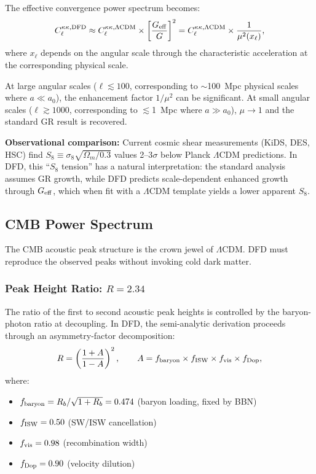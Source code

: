 \documentclass[aps,prd,twocolumn,superscriptaddress,nofootinbib]{revtex4-2}
\begin{document}
The effective convergence power spectrum becomes:
\begin{equation}
C_\ell^{\kappa\kappa,\rm DFD} \approx
C_\ell^{\kappa\kappa,\rm \Lambda CDM}\times
\left[\frac{G_{\rm eff}}{G}\right]^2
= C_\ell^{\kappa\kappa,\rm \Lambda CDM}\times\frac{1}{\mu^2(x_\ell)},
\end{equation}
where $x_\ell$ depends on the angular scale through the
characteristic acceleration at the corresponding physical scale.

At large angular scales ($\ell \lesssim 100$, corresponding to
$\sim$100~Mpc physical scales where $a \ll a_0$), the enhancement
factor $1/\mu^2$ can be significant. At small angular scales
($\ell \gtrsim 1000$, corresponding to $\lesssim$1~Mpc where
$a \gg a_0$), $\mu \to 1$ and the standard GR result is recovered.

\textbf{Observational comparison:} Current cosmic shear measurements
(KiDS, DES, HSC) find $S_8 \equiv \sigma_8\sqrt{\Omega_m/0.3}$
values 2--3$\sigma$ below Planck $\Lambda$CDM predictions. In DFD,
this ``$S_8$ tension'' has a natural interpretation: the standard
analysis assumes GR growth, while DFD predicts scale-dependent
enhanced growth through $G_{\rm eff}$, which when fit with a
$\Lambda$CDM template yields a lower apparent $S_8$.

\subsection{CMB Power Spectrum}\label{sec:cmb}

The CMB acoustic peak structure is the crown jewel of
$\Lambda$CDM. DFD must reproduce the observed peaks without
invoking cold dark matter.

\subsubsection{Peak Height Ratio: $R = 2.34$}

The ratio of the first to second acoustic peak heights is
controlled by the baryon-photon ratio at decoupling. In DFD,
the semi-analytic derivation proceeds through an asymmetry-factor
decomposition:
\begin{equation}\label{eq:R-derivation}
R = \left(\frac{1+A}{1-A}\right)^2, \qquad
A = f_{\rm baryon}\times f_{\rm ISW}\times f_{\rm vis}\times f_{\rm Dop},
\end{equation}
where:
\begin{itemize}[nosep]
\item $f_{\rm baryon} = R_b/\sqrt{1+R_b} = 0.474$
  (baryon loading, fixed by BBN)
\item $f_{\rm ISW} = 0.50$ (SW/ISW cancellation)
\item $f_{\rm vis} = 0.98$ (recombination width)
\item $f_{\rm Dop} = 0.90$ (velocity dilution)
\end{itemize}
\end{document}
